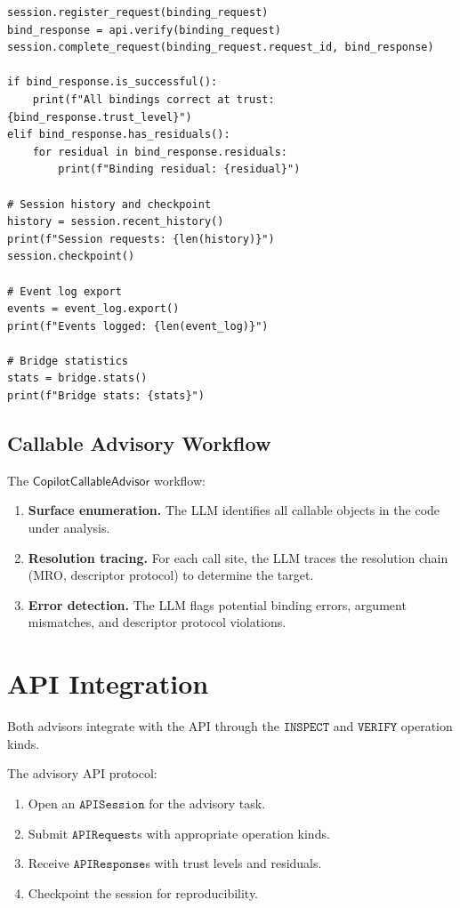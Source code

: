 \documentclass[11pt]{article}
\newcommand{\CallAdv}{\mathsf{CopilotCallableAdvisor}}
\begin{document}
\begin{lstlisting}[style=jugeo-python, caption={Callable advisor via JuGeo API with federated verification.}, label=lst:callable-api]
session.register_request(binding_request)
bind_response = api.verify(binding_request)
session.complete_request(binding_request.request_id, bind_response)

if bind_response.is_successful():
    print(f"All bindings correct at trust: {bind_response.trust_level}")
elif bind_response.has_residuals():
    for residual in bind_response.residuals:
        print(f"Binding residual: {residual}")

# Session history and checkpoint
history = session.recent_history()
print(f"Session requests: {len(history)}")
session.checkpoint()

# Event log export
events = event_log.export()
print(f"Events logged: {len(event_log)}")

# Bridge statistics
stats = bridge.stats()
print(f"Bridge stats: {stats}")
\end{lstlisting}

\subsection{Callable Advisory Workflow}
\label{sec:callable:workflow}

The $\CallAdv$ workflow:

\begin{enumerate}
\item \textbf{Surface enumeration.}  The LLM identifies all
  callable objects in the code under analysis.

\item \textbf{Resolution tracing.}  For each call site, the
  LLM traces the resolution chain (MRO, descriptor protocol)
  to determine the target.

\item \textbf{Error detection.}  The LLM flags potential binding
  errors, argument mismatches, and descriptor protocol violations.
\end{enumerate}

\section{API Integration}
\label{sec:integration}

Both advisors integrate with the \JuGeo{} API through the
$\texttt{INSPECT}$ and $\texttt{VERIFY}$ operation kinds.

\begin{definition}
\label{def:api-protocol}
The advisory API protocol:
\begin{enumerate}
\item Open an $\texttt{APISession}$ for the advisory task.
\item Submit $\texttt{APIRequest}$s with appropriate operation kinds.
\item Receive $\texttt{APIResponse}$s with trust levels and residuals.
\item Checkpoint the session for reproducibility.
\end{enumerate}
\end{definition}
\end{document}
